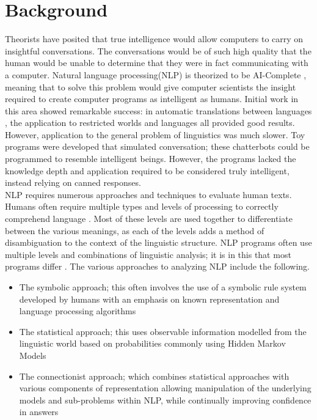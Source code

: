 \chapter{Background}
Theorists have posited that true intelligence would allow computers to carry on insightful conversations. The conversations would be of such high quality that the human would be unable to determine that they were in fact communicating with a computer\cite{TURING_TEST}.  Natural language processing(NLP) is theorized to be AI-Complete \cite{AICOMPLETE}, meaning that to solve this problem would give computer scientists the insight required to create computer programs as intelligent as humans.  Initial work in this area showed remarkable success: in automatic translations between languages \cite{EN_RUS}, the application to restricted worlds and languages\cite{AI_MODERN} all provided good results.  However, application to the general problem of linguistics was much slower.  Toy programs were developed that simulated conversation; these chatterbots could be programmed to resemble intelligent beings.  However, the programs lacked the knowledge depth and application required to be considered truly intelligent, instead relying on canned responses.  
\\
NLP requires numerous approaches and techniques to evaluate human texts. Humans often require multiple types and levels of processing to correctly comprehend language \cite{NLPENCY}. Most of these levels are used together to differentiate between the various meanings, as each of the levels adds a method of disambiguation to the context of the linguistic structure.  NLP programs often use multiple levels and combinations of linguistic analysis; it is in this that most programs differ \cite{NLPENCY}.  The various approaches to analyzing NLP include the following.
\begin{itemize}
	\item The symbolic approach; this often involves the use of a symbolic rule system developed by humans with an emphasis on known representation and language processing algorithms
	\item The statistical approach; this uses observable information modelled from the linguistic world based on probabilities commonly using Hidden Markov Models
	\item The connectionist approach; which combines statistical approaches with various components of representation allowing manipulation of the underlying models and sub-problems within NLP, while continually improving confidence in answers
\end{itemize}
